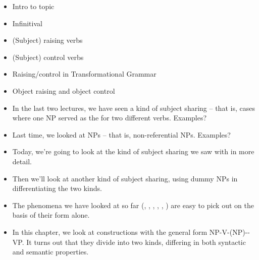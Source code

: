 \documentclass[a4paper,landscape,headrule,footrule,dvips]{foils}
\begin{document}
\maketitle

%



\begin{itemize}
\item Intro to topic
\item Infinitival 
\item (Subject) raising verbs
\item (Subject) control verbs
\item Raising/control in Transformational Grammar
\item Object raising and object control
\end{itemize}


\begin{itemize}
\item In the last two lectures, we have seen a kind of 
subject sharing -- that is, cases where one NP 
served as the  for two different verbs.  
Examples?
\item Last time, we looked at  NPs --  that is, 
non-referential NPs.  Examples?
\item Today, we’re going to look at the kind of subject 
sharing we saw with  in more detail.
\item Then we’ll look at another kind of subject 
sharing, using dummy NPs in differentiating the 
two kinds.
\end{itemize}


\begin{itemize}
\item The phenomena we have looked at so far (,
  , , ,
  , ) are easy to pick out on the
  basis of their form alone.
\item In this chapter, we look at constructions with the general form
  NP-V-(NP)--VP.  It turns out that they divide into two
  kinds, differing in both syntactic and semantic properties.
\end{itemize}
\end{document}
